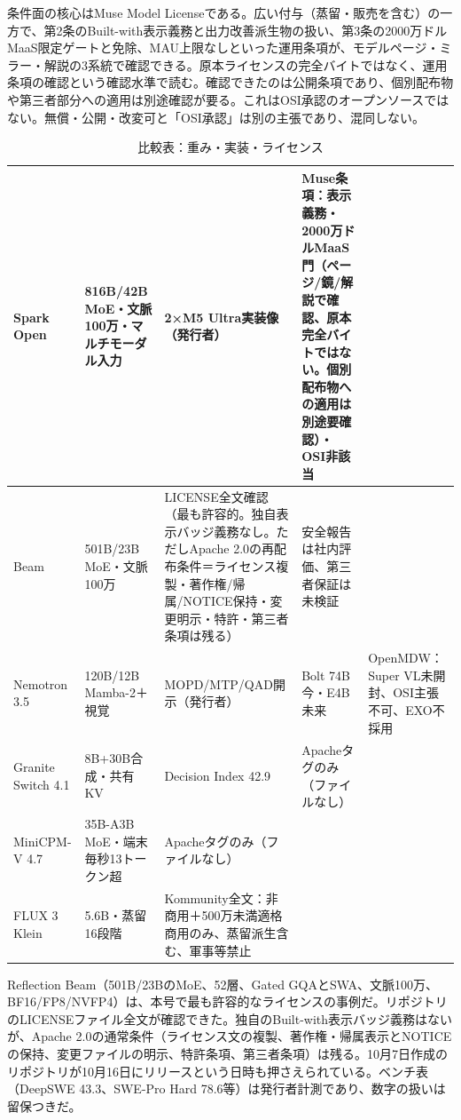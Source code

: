 \documentclass[lualatex,a4paper,10pt]{jlreq}
\begin{document}
条件面の核心はMuse Model Licenseである。広い付与（蒸留・販売を含む）の一方で、第2条のBuilt-with表示義務と出力改善派生物の扱い、第3条の2000万ドルMaaS限定ゲートと免除、MAU上限なしといった運用条項が、モデルページ・ミラー・解説の3系統で確認できる。原本ライセンスの完全バイトではなく、運用条項の確認という確認水準で読む。確認できたのは公開条項であり、個別配布物や第三者部分への適用は別途確認が要る。これはOSI承認のオープンソースではない。無償・公開・改変可と「OSI承認」は別の主張であり、混同しない。
\cite{B14,B70,B15,B13,B71}


\begin{table}[htbp]\centering\footnotesize
\caption{比較表：重み・実装・ライセンス}
\begin{tabularx}{0.96\linewidth}{@{}lXXXX@{}}
\toprule
Spark Open & 816B/42B MoE・文脈100万・マルチモーダル入力 & 2×M5 Ultra実装像（発行者） & Muse条項：表示義務・2000万ドルMaaS門（ページ/鏡/解説で確認、原本完全バイトではない。個別配布物への適用は別途要確認）・OSI非該当 \cite{B14,B70,B15,B13} \\
\midrule
Beam & 501B/23B MoE・文脈100万 & LICENSE全文確認（最も許容的。独自表示バッジ義務なし。ただしApache 2.0の再配布条件＝ライセンス複製・著作権/帰属/NOTICE保持・変更明示・特許・第三者条項は残る） & 安全報告は社内評価、第三者保証は未検証 \cite{B17,B19,B18,B16} \\
\midrule
Nemotron 3.5 & 120B/12B Mamba-2＋視覚 & MOPD/MTP/QAD開示（発行者） & Bolt 74B今・E4B未来 & OpenMDW：Super VL未開封、OSI主張不可、EXO不採用 \cite{B21,B72,B22,B20} \\
\midrule
Granite Switch 4.1 & 8B+30B合成・共有KV & Decision Index 42.9 & Apacheタグのみ（ファイルなし） \cite{B24,B73,B23,B25} \\
\midrule
MiniCPM-V 4.7 & 35B-A3B MoE・端末毎秒13トークン超 & Apacheタグのみ（ファイルなし） \cite{B27,B74,B26} \\
\midrule
FLUX 3 Klein & 5.6B・蒸留16段階 & Kommunity全文：非商用＋500万未満適格商用のみ、蒸留派生含む、軍事等禁止 \cite{B29,B28,B30} \\
\bottomrule
\end{tabularx}
\end{table}

Reflection Beam（501B/23BのMoE、52層、Gated GQAとSWA、文脈100万、BF16/FP8/NVFP4）は、本号で最も許容的なライセンスの事例だ。リポジトリのLICENSEファイル全文が確認できた。独自のBuilt-with表示バッジ義務はないが、Apache 2.0の通常条件（ライセンス文の複製、著作権・帰属表示とNOTICEの保持、変更ファイルの明示、特許条項、第三者条項）は残る。10月7日作成のリポジトリが10月16日にリリースという日時も押さえられている。ベンチ表（DeepSWE 43.3、SWE-Pro Hard 78.6等）は発行者計測であり、数字の扱いは留保つきだ。
\cite{B17,B19,B18,B16}
\end{document}
